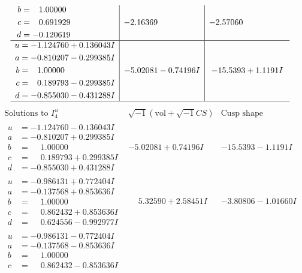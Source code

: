 \documentclass[1p]{elsarticle_modified}
\theoremstyle{definition}
\newcommand{\I}{\sqrt{-1}}
\begin{document}
$$\begin{array}{c|c|c}
\begin{aligned}
b &= \phantom{-}1.00000\phantom{ +0.000000I} \\
c &= \phantom{-}0.691929\phantom{ +0.000000I} \\
d &= -0.120619\phantom{ +0.000000I}\end{aligned}
 & -2.16369\phantom{ +0.000000I} & -2.57060\phantom{ +0.000000I} \\ \hline\begin{aligned}
u &= -1.124760 + 0.136043 I \\
a &= -0.810207 - 0.299385 I \\
b &= \phantom{-}1.00000\phantom{ +0.000000I} \\
c &= \phantom{-}0.189793 - 0.299385 I \\
d &= -0.855030 - 0.431288 I\end{aligned}
 & -5.02081 - 0.74196 I & -15.5393 + 1.1191 I\\
 \hline 
 \end{array}$$\newpage$$\begin{array}{c|c|c}  
\text{Solutions to }I^u_{4}& \I (\text{vol} + \sqrt{-1}CS) & \text{Cusp shape}\\
 \hline 
\begin{aligned}
u &= -1.124760 - 0.136043 I \\
a &= -0.810207 + 0.299385 I \\
b &= \phantom{-}1.00000\phantom{ +0.000000I} \\
c &= \phantom{-}0.189793 + 0.299385 I \\
d &= -0.855030 + 0.431288 I\end{aligned}
 & -5.02081 + 0.74196 I & -15.5393 - 1.1191 I \\ \hline\begin{aligned}
u &= -0.986131 + 0.772404 I \\
a &= -0.137568 + 0.853636 I \\
b &= \phantom{-}1.00000\phantom{ +0.000000I} \\
c &= \phantom{-}0.862432 + 0.853636 I \\
d &= \phantom{-}0.624556 - 0.992977 I\end{aligned}
 & \phantom{-}5.32590 + 2.58451 I & -3.80806 - 1.01660 I \\ \hline\begin{aligned}
u &= -0.986131 - 0.772404 I \\
a &= -0.137568 - 0.853636 I \\
b &= \phantom{-}1.00000\phantom{ +0.000000I} \\
c &= \phantom{-}0.862432 - 0.853636 I \\

\end{aligned}
\end{array}$$
\end{document}
